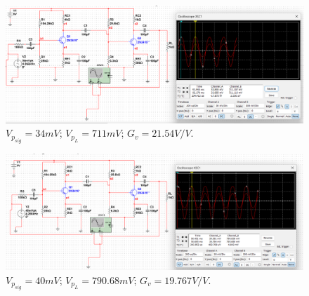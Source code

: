 \begin{figure}[H]
	\centering
	\includegraphics[width=.8\linewidth]{./my-chapters/my-images/Question10/c_ketqua_0.png}
	\caption{$V_{p_{sig}} =34mV$; $V_{p_{L}} = 711 mV$; $G_{v} = 21.54 V/V$.}
\end{figure}
\begin{figure}[H]
	\centering
	\includegraphics[width=.8\linewidth]{./my-chapters/my-images/Question10/c_ketqua_1.png}
	\caption{$V_{p_{sig}} =40mV$; $V_{p_{L}} = 790.68 mV$; $G_{v} = 19.767V/V$.}
\end{figure}